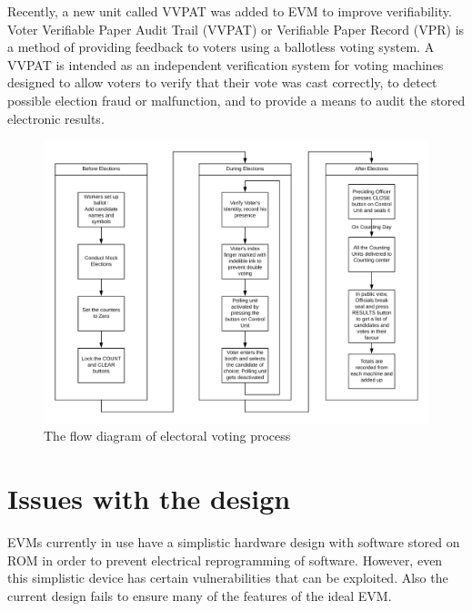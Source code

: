 \documentclass[a4paper,12pt,openany]{book}
\begin{document}
Recently, a new unit called VVPAT was added to EVM to improve verifiability. Voter Verifiable Paper Audit Trail (VVPAT) or Verifiable Paper Record (VPR) is a method of providing feedback to voters using a ballotless voting system. A VVPAT is intended as an independent verification system for voting machines designed to allow voters to verify that their vote was cast correctly, to detect possible election fraud or malfunction, and to provide a means to audit the stored electronic results.
\newpage
\begin{figure}[!hb]
\includegraphics[scale=0.2]{FlowCurrent.PNG}
\caption{The flow diagram of electoral voting process}
\end{figure}
\newpage
\section{Issues with the design}
EVMs currently in use have a simplistic hardware design with software stored on ROM in order to prevent electrical reprogramming of software. However, even this simplistic device has certain vulnerabilities that can be exploited. Also the current design fails to ensure many of the features of the ideal EVM.
\end{document}
